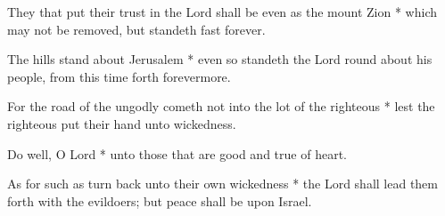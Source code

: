 \begin{multicols}{2}
	
	They that put their trust in the Lord shall be even as the mount Zion * which may not be removed, but standeth fast forever.
	
	The hills stand about Jerusalem * even so standeth the Lord round about his people, from this time forth forevermore.
	
	For the road of the ungodly cometh not into the lot of the righteous * lest the righteous put their hand unto wickedness.
	
	Do well, O Lord * unto those that are good and true of heart.
	
	As for such as turn back unto their own wickedness * the Lord shall lead them forth with the evildoers; but peace shall be upon Israel.
	
	\gloria{}
\end{multicols}